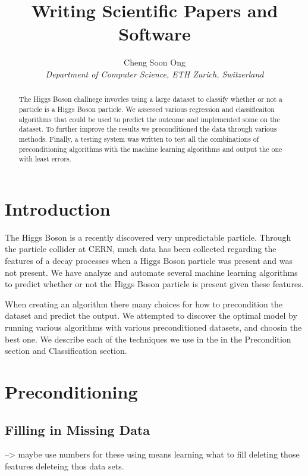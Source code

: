\documentclass[10pt,conference,compsocconf]{IEEEtran}
\begin{document}
\title{Writing Scientific Papers and Software}

\author{
  Cheng Soon Ong\\
  \textit{Department of Computer Science, ETH Zurich, Switzerland}
}

\maketitle

\begin{abstract}
 The Higgs Boson challnege invovles using a large dataset to classify whether or not a particle is a Higgs Boson particle. We assessed various regression and classificaiton algorithms that could be used to predict the outcome and implemented some on the dataset. To further improve the results we preconditioned the data through various methods. Finally, a testing system was written to test all the combinations of preconditioning algorithms with the machine learning algorithms and output the one with least errors. 
\end{abstract}

\section{Introduction}
The Higgs Boson is a recently discovered very unpredictable particle. Through the particle collider at CERN, much data has been collected regarding the features of a decay processes when a Higgs Boson particle was present and was not present. We have analyze and automate several machine learning algorithms to predict whether or not the Higgs Boson particle is present given these features. 

When creating an algorithm there many choices for how to precondition the dataset and predict the output. We attempted to discover the optimal model by running various algorithms with various preconditioned datasets, and choosin the best one. We describe each of the techniques we use in the in the Precondition section and Classification section. 

\section{Preconditioning}
\label{sec:PreCond}

\subsection{Filling in Missing Data}
--> maybe use numbers for these
using means
learning what to fill
deleting those features
deleteing thos data sets.
\end{document}
